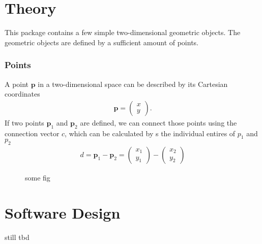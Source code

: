 \chapter{Theory}
This package contains a few simple two-dimensional geometric objects. The geometric objects are defined by a sufficient amount of points.
\subsection{Points}
A point $\mathbf{p}$ in a two-dimensional space can be described by its Cartesian coordinates
\begin{align}
    \mathbf{p} = \begin{pmatrix} x \\ y \end{pmatrix}.
\end{align}
If two points $\mathbf{p}_1$ and $\mathbf{p}_2$ are defined, we can connect those points using the connection vector $c$, which can be calculated by s the individual entires of $p_1$ and $p_2$
\begin{align}
    d  = \mathbf{p}_1 - \mathbf{p}_2 = \begin{pmatrix} x_1 \\ y_1 \end{pmatrix} - \begin{pmatrix} x_2 \\ y_2 \end{pmatrix}
\end{align}

\begin{figure}[h]
    \centering
    \caption{some fig}
    \label{fig:lattice}
\end{figure}

\chapter{Software Design}
still tbd
